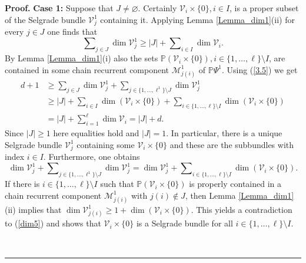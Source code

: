 \documentclass[10pt,a4paper]{amsart}
\newenvironment{proof}[1][Proof]{\noindent\textbf{#1.} }{\ \rule{0.5em}{0.5em}}
\begin{document}
\begin{proof}
		\textbf{Case 1:} Suppose that $J\not =\varnothing$. Certainly $\mathcal{V}%
		_{i}\times\{0\},i\in I$, is a proper subset of the Selgrade bundle
		$\mathcal{V}_{j}^{1}$ containing it. Applying Lemma \ref{Lemma_dim1}(ii) for
		every $j\in J$ one finds that
		\begin{equation}
			\sum\nolimits_{j\in J}\dim\mathcal{V}_{j}^{1}\geq\left\vert J\right\vert
			+\sum\nolimits_{i\in I}\dim\mathcal{V}_{i}. \label{3.5}%
		\end{equation}
		By Lemma \ref{Lemma_dim1}(i) also the sets $\mathbb{P}\left(  \mathcal{V}%
		_{i}\times\{0\}\right)  ,i\in\{1,\ldots,\ell\}\setminus I$, are contained in
		some chain recurrent component $\mathcal{M}_{j(i)}^{1}$ of $\mathbb{P}\Psi
		^{1}$. Using (\ref{3.5}) we get
		\begin{align}
			d+1  &  \geq\sum\nolimits_{j\in J}\dim\mathcal{V}_{j}^{1}+\sum\nolimits_{j\in
				\{1,\ldots,\ell^{1}\}\setminus J}\dim\mathcal{V}_{j}^{1}\nonumber\\
			&  \geq\left\vert J\right\vert +\sum\nolimits_{i\in I}\dim(\mathcal{V}%
			_{i}\times\{0\})+\sum\nolimits_{i\in\{1,\ldots,\ell\}\setminus I}\dim\left(
			\mathcal{V}_{i}\times\{0\}\right) \label{dim3}\\
			&  =\left\vert J\right\vert +\sum\nolimits_{i=1}^{\ell}\dim\mathcal{V}%
			_{i}=\left\vert J\right\vert +d.\nonumber
		\end{align}
		Since $\left\vert J\right\vert \geq1$ here equalities hold and $\left\vert
		J\right\vert =1$. In particular, there is a unique Selgrade bundle
		$\mathcal{V}_{j}^{1}$ containing some $\mathcal{V}_{i}\times\{0\}$ and these
		are the subbundles with index $i\in I$. Furthermore, one obtains%
		\begin{equation}
			\dim\mathcal{V}_{j}^{1}+\sum\nolimits_{j\in\{1,\ldots,\ell^{1}\}\setminus
				J}\dim\mathcal{V}_{j}^{1}=\dim\mathcal{V}_{j}^{1}+\sum\nolimits_{i\in
				\{1,\ldots,\ell\}\setminus I}\dim\left(  \mathcal{V}_{i}\times\{0\}\right)  .
			\label{dim5}%
		\end{equation}
		If there is $i\in\{1,\ldots,\ell\}\setminus I$ such that $\mathbb{P}\left(
		\mathcal{V}_{i}\times\{0\}\right)  $ is properly contained in a chain
		recurrent component $\mathcal{M}_{j(i)}^{1}$ with $j(i)\not \in J$, then Lemma
		\ref{Lemma_dim1}(ii) implies that $\dim\mathcal{V}_{j(i)}^{1}\geq1+\dim\left(
		\mathcal{V}_{i}\times\{0\}\right)  $. This yields a contradiction to
		(\ref{dim5}) and shows that $\mathcal{V}_{i}\times\{0\}$ is a Selgrade bundle
		for all $i\in\{1,\ldots,\ell\}\setminus I$.
		

\end{proof}
\end{document}
